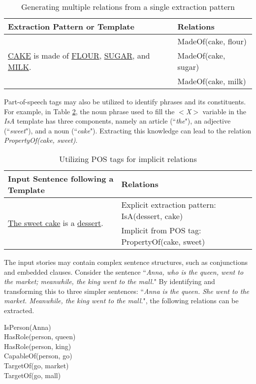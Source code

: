\begin{table}[ht]   %
\centering
\caption{Generating multiple relations from a single extraction pattern} \vspace{0.25em}
\begin{tabular}{|l|l|} \hline
Extraction Pattern or Template & Relations \\ \hline
\multirow{3}{*}{\underline{CAKE} is made of \underline{FLOUR}, \underline{SUGAR}, and \underline{MILK}.} & MadeOf(cake, flour) \\
 & MadeOf(cake, sugar) \\
 & MadeOf(cake, milk) \\ \hline
\end{tabular}
\label{tab:multiplerelationssingle}
\end{table}

Part-of-speech tags may also be utilized to identify phrases and its constituents. For example, in Table \ref{tab:utilizeposforimplicit}, the noun phrase used to fill the \textit{$<$X$>$} variable in the \textit{IsA} template has three components, namely an article (``\textit{the}"), an adjective (``\textit{sweet}"), and a noun (``\textit{cake}"). Extracting this knowledge can lead to the relation \textit{PropertyOf(cake, sweet)}. 

\begin{table}[ht]   %
\centering
\caption{Utilizing POS tags for implicit relations} \vspace{0.25em}
\begin{tabular}{|l|p{6cm}|} \hline
Input Sentence following a Template & Relations \\ \hline
\multirow{2}{*}{\underline{The sweet cake} is a \underline{dessert}.} & Explicit extraction pattern: IsA(dessert, cake) \\
 & Implicit from POS tag: PropertyOf(cake, sweet) \\ \hline
\end{tabular}
\label{tab:utilizeposforimplicit}
\end{table}

The input stories may contain complex sentence structures, such as conjunctions and embedded clauses. Consider the sentence ``\textit{Anna, who is the queen, went to the market; meanwhile, the king went to the mall.}" By identifying and transforming this to three simpler sentences: ``\textit{Anna is the queen. She went to the market. Meanwhile, the king went to the mall.}", the following relations can be extracted. 

\noindent
	\hspace{1 in}IsPerson(Anna) \\
	\hspace*{1 in}HasRole(person, queen) \\
	\hspace*{1 in}HasRole(person, king) \\
	\hspace*{1 in}CapableOf(person, go) \\
	\hspace*{1 in}TargetOf(go, market) \\
	\hspace*{1 in}TargetOf(go, mall)





